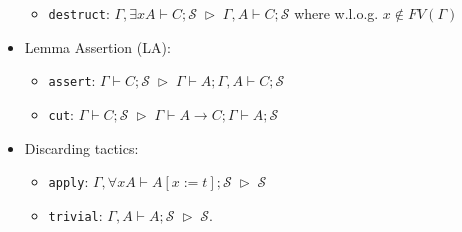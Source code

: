 \documentclass[a4paper,UKenglish]{lipics}
\newcommand{\G}{\Gamma}
\newcommand{\Sc}{\mathcal{S}}
\begin{document}
\begin{definition}
\begin{itemize}
\begin{itemize}
	\vspace{0.2cm}
	\item {\tt destruct}: $\G,\exists x A\vdash C;\Sc\;\rhd\; \G,A\vdash C;\Sc$ 
where w.l.o.g. $x\notin FV(\G)$
\end{itemize}

\item Lemma Assertion (LA): 
\begin{itemize}
	\item {\tt assert}: $\G\vdash C;\Sc\;\rhd\; \G\vdash A;\G,A\vdash C;\Sc$
	\vspace{0.2cm}
	\item {\tt cut}: $\G\vdash C;\Sc\;\rhd\; \G\vdash A\to C;\G\vdash A;\Sc$
	\end{itemize}

\item Discarding tactics:
\begin{itemize}
	\item {\tt apply}: $\G,\forall xA\vdash A[x:=t];\Sc\;\rhd\;\Sc$
	\vspace{0.2cm}
	\item {\tt trivial}: $\G,A\vdash A;\Sc \;\rhd\; \Sc$. 
	\vspace{0.2cm}

\end{itemize}
\end{itemize}
\end{definition}
\end{document}

